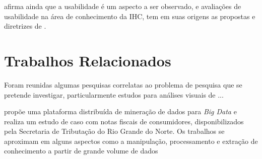          afirma ainda que a usabilidade é um aspecto a ser observado, e avaliações de usabilidade na área de conhecimento da \acf{IHC}, tem em suas origens as propostas e diretrizes de . 


\section{Trabalhos Relacionados} \label{sec:trabrelac} \textbf{ }

    Foram reunidas algumas pesquisas correlatas ao problema de pesquisa que se pretende investigar, particularmente estudos para análises visuais de ...

    \textbf{ } 

     propõe uma plataforma distribuída de mineração de dados para \textit{Big Data} e realiza um estudo de caso com notas fiscais de consumidores, disponibilizados pela Secretaria de Tributação do Rio Grande do Norte. Os trabalhos se aproximam em alguns aspectos como a manipulação, processamento e extração de conhecimento a partir de grande volume de dados